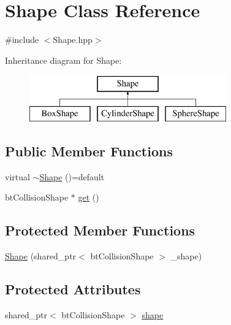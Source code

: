 \hypertarget{class_shape}{}\section{Shape Class Reference}
\label{class_shape}


{\ttfamily \#include $<$Shape.\+hpp$>$}

Inheritance diagram for Shape\+:\begin{figure}[H]
\begin{center}
\leavevmode
\includegraphics[height=2.000000cm]{class_shape}
\end{center}
\end{figure}
\subsection*{Public Member Functions}
\begin{DoxyCompactItemize}
\item 
virtual \mbox{\hyperlink{class_shape_ac8ad2fd02e1e94beeb98e65ab795cd56}{$\sim$\+Shape}} ()=default
\item 
bt\+Collision\+Shape $\ast$ \mbox{\hyperlink{class_shape_a0c6d149b79d77a23e32d915aa4b4aa30}{get}} ()
\end{DoxyCompactItemize}
\subsection*{Protected Member Functions}
\begin{DoxyCompactItemize}
\item 
\mbox{\hyperlink{class_shape_a70a5dc66f409ae0ddafb35927b091fec}{Shape}} (shared\+\_\+ptr$<$ bt\+Collision\+Shape $>$ \+\_\+shape)
\end{DoxyCompactItemize}
\subsection*{Protected Attributes}
\begin{DoxyCompactItemize}
\item 
shared\+\_\+ptr$<$ bt\+Collision\+Shape $>$ \mbox{\hyperlink{class_shape_a2dfbbc42dde579257637148489c1fb9b}{shape}}
\end{DoxyCompactItemize}


